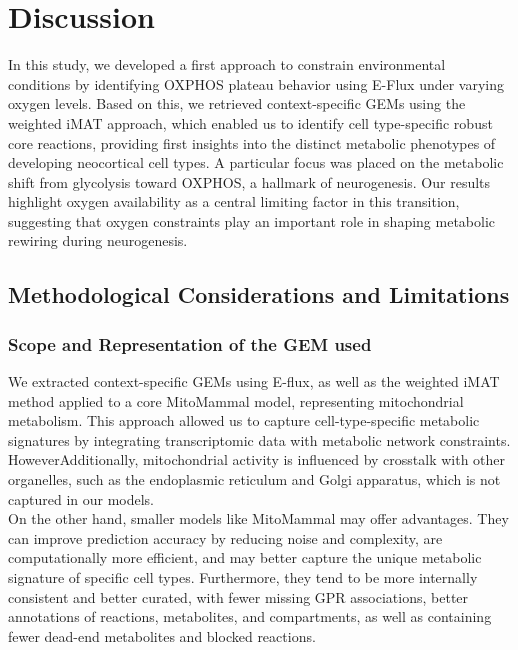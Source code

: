 \chapter{Discussion}
In this study, we developed a first approach to constrain environmental conditions by identifying OXPHOS plateau behavior using E-Flux under varying oxygen levels. Based on this, we retrieved context-specific GEMs using the weighted iMAT approach, which enabled us to identify cell type-specific robust core reactions, providing first insights into the distinct metabolic phenotypes of developing neocortical cell types. A particular focus was placed on the metabolic shift from glycolysis toward OXPHOS, a hallmark of neurogenesis. Our results highlight oxygen availability as a central limiting factor in this transition, suggesting that oxygen constraints play an important role in shaping metabolic rewiring during neurogenesis. 

\section{Methodological Considerations and Limitations}

\subsection{Scope and Representation of the GEM used}
We extracted context-specific GEMs using E-flux, as well as  the weighted iMAT method applied to a core MitoMammal model, representing mitochondrial metabolism. This approach allowed us to capture cell-type-specific metabolic signatures by integrating transcriptomic data with metabolic network constraints. 
\\

HoweverAdditionally, mitochondrial activity is influenced by crosstalk with other organelles, such as the endoplasmic reticulum and Golgi apparatus, which is not captured in our models. 
\\

On the other hand, smaller models like MitoMammal may offer advantages. They can improve prediction accuracy by reducing noise and complexity, are computationally more efficient, and may better capture the unique metabolic signature of specific cell types. Furthermore, they tend to be more internally consistent and better curated, with fewer missing GPR associations, better annotations of reactions, metabolites, and compartments, as well as containing fewer dead-end metabolites and blocked reactions.  
\\

